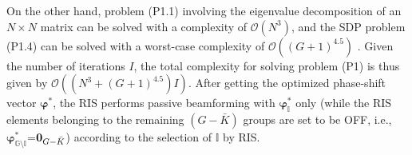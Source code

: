 \documentclass[draftclsnofoot,onecolumn,12pt]{IEEEtran}
\begin{document}
	On the other hand, problem (P1.1) involving the eigenvalue decomposition of an $N\times N$ matrix can be solved with a complexity of $\mathcal{O}(N^3)$, and the SDP problem (P1.4) can be solved with a worst-case complexity of $\mathcal{O}((G+1)^{4.5})$ \cite{Luo2010Semidefinite}. 
	Given the number of iterations $I$, the total complexity for solving problem (P1)  is thus
	given by $\mathcal{O}\left( (N^3+(G+1)^{4.5})I \right)$. 
After getting the optimized phase-shift vector ${\bm \varphi}^*$, the RIS performs passive beamforming with ${\bm \varphi}^*_{\mathbb I}$ only (while the RIS elements belonging to the remaining $(G-\bar K)$ groups are set to be OFF, i.e., ${\bm \varphi}^*_{\mathbb{G}\setminus \mathbb{I}}$=${\bf 0}_{G-\bar{K}}$) according to the selection of ${\mathbb I}$ by RIS. 
\end{document}
